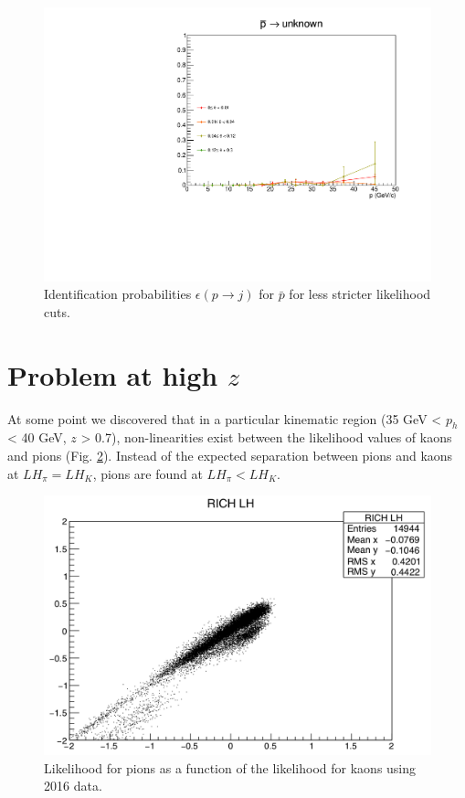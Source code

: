 \begin{figure}[!p]
  \includegraphics[scale=0.38]{./gfx/pm_u_less.pdf}
	\caption{Identification probabilities $\epsilon(p \rightarrow j)$ for $\bar{p}$ for less stricter likelihood cuts.}
	\label{pic:Effpmless}
\end{figure}

\newpage

\section{Problem at high $z$}

At some point we discovered that in a particular kinematic region (35 GeV < $p_h$ < 40 GeV, $z$ > 0.7), non-linearities exist between the likelihood values of kaons and pions (Fig. \ref{pic:NonLin}). Instead of the expected separation between pions and kaons at $LH_{\pi} = LH_K$, pions are found at $LH_{\pi} < LH_K$.

\begin{figure}[!h]
  \centering
	\includegraphics[scale=0.35]{./gfx/RICHLH.png}
	\caption{Likelihood for pions as a function of the likelihood for kaons using 2016 data.}
	\label{pic:NonLin}
\end{figure}

